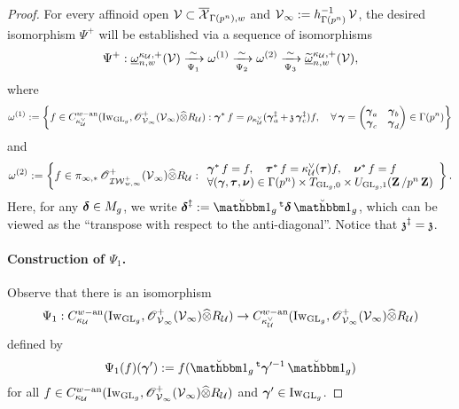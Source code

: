 \begin{proof}
For every affinoid open $\calV\subset \overline{\calX}_{\Gamma(p^n),w}$ and $\calV_{\infty}:=h_{\Gamma(p^n)}^{-1}\calV$, the desired isomorphism $\Psi^+$ will be established via a sequence of isomorphisms 
$$ \Psi^+: \underline{\omega}_{n,w}^{\kappa_{\calU},+}(\calV) \xrightarrow[\Psi_1]{\sim} \omega^{(1)} \xrightarrow[\Psi_2]{\sim} \omega^{(2)}\xrightarrow[\Psi_3]{\sim} \widetilde{\underline{\omega}}_{n,w}^{\kappa_{\calU},+}(\calV),
$$
where 
$$
\omega^{(1)} := \left\{ f\in C_{\kappa_{\calU}^{\vee}}^{w-\an}(\Iw_{\GL_g}, \scrO^+_{\calV_{\infty}}(\calV_{\infty})\widehat{\otimes}R_{\calU}): \bfgamma^* f = \rho_{\kappa_{\calU}^{\vee}}(\bfgamma_a^{\ddagger} + \frakz \bfgamma_c^{\ddagger}) f, \quad \forall \bfgamma = \begin{pmatrix} \bfgamma_a & \bfgamma_b \\ \bfgamma_c & \bfgamma_d\end{pmatrix} \in \Gamma(p^n)\right\}
$$
and
$$
\omega^{(2)} := \left\{f\in \pi_{\infty, *}\scrO^+_{\adicIW_{w, \infty}^+}(\calV_{\infty})\widehat{\otimes}R_{\calU}: \begin{array}{l}
        \bfgamma^* f = f, \quad \bftau^*f = \kappa_{\calU}^{\vee}(\bftau)f, \quad \bfnu^* f = f  \\
        \forall (\bfgamma, \bftau, \bfnu)\in \Gamma(p^n)\times T_{\GL_g, 0}\times U_{\GL_g,1}(\Z/p^n\Z) 
    \end{array}\right\}.
$$
Here, for any $\bfdelta \in M_g$, we write $\bfdelta^{\ddagger} := \oneanti_g \trans\bfdelta \oneanti_g$, which can be viewed as the ``transpose with respect to the anti-diagonal''. Notice that $\frakz^{\ddagger} = \frakz$. 

\paragraph{Construction of $\Psi_1$.}
Observe that there is an isomorphism \[
    \Psi_1: C_{\kappa_{\calU}}^{w-\an}(\Iw_{\GL_g}, \scrO^+_{\calV_{\infty}}(\calV_{\infty})\widehat{\otimes} R_{\calU}) \rightarrow C_{\kappa_{\calU}^{\vee}}^{w-\an}(\Iw_{\GL_g}, \scrO^+_{\calV_{\infty}}(\calV_{\infty})\widehat{\otimes} R_{\calU})
\] 
defined by 
$$\Psi_1(f)(\bfgamma'):=f(\oneanti_g \trans\bfgamma'^{-1}\oneanti_g)$$
for all $f\in C_{\kappa_{\calU}}^{w-\an}(\Iw_{\GL_g}, \scrO^+_{\calV_{\infty}}(\calV_{\infty})\widehat{\otimes} R_{\calU})$ and $\bfgamma'\in \Iw_{\GL_g}$.


\end{proof}
